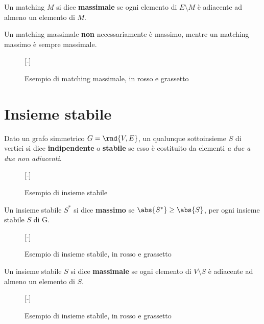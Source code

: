 \documentclass[\main/main.tex]{subfiles}
\begin{document}
\clearpage
\begin{definition}
	Un matching \(M\) si dice \textbf{massimale} se ogni elemento di \(E\setminus M\) è adiacente ad almeno un elemento di \(M\).

	Un matching massimale \textbf{non} necessariamente è massimo, mentre un matching massimo è sempre massimale.
	\begin{figure}
		[-]
		\MaximalMatching{}
		\caption{Esempio di matching massimale, in rosso e grassetto}
	\end{figure}
\end{definition}
\clearpage
\section{Insieme stabile}
\begin{definition}
	Dato un grafo simmetrico \(G=\rnd{V, E}\), un qualunque sottoinsieme \(S\) di vertici si dice \textbf{indipendente} o \textbf{stabile} se esso è costituito da elementi \textit{a due a due non adiacenti}.
	\begin{figure}
		[-]
		\InsiemeStabile{}
		\caption{Esempio di insieme stabile}
	\end{figure}
\end{definition}
\begin{definition}
	Un insieme stabile \(S^*\) si dice \textbf{massimo} se \(\abs{S^*} \geq \abs{S}\), per ogni insieme stabile \(S\) di G.

	\begin{figure}
		[-]
		\InsiemeStabile{}
		\caption{Esempio di insieme stabile, in rosso e grassetto}
	\end{figure}
\end{definition}
\begin{definition}
	Un insieme stabile \(S\) si dice \textbf{massimale} se ogni elemento di \(V\setminus S\) è adiacente ad almeno un elemento di \(S\).

	\begin{figure}
		[-]
		\InsiemeStabile{}
		\caption{Esempio di insieme stabile, in rosso e grassetto}
	\end{figure}
\end{definition}
\clearpage
\end{document}
